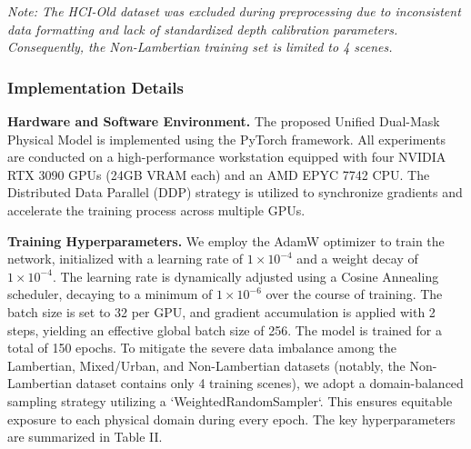 \begin{table}[!t]
\small
\caption{Dataset Domain / Scene Type No. of Scenes (Train / Test).}
\label{tab:table1}
\centering
{}
\end{table}
\textit{Note: The HCI-Old dataset was excluded during preprocessing due to inconsistent data formatting and lack of standardized depth calibration parameters. Consequently, the Non-Lambertian training set is limited to 4 scenes.}

\subsubsection{Implementation Details}

\textbf{Hardware and Software Environment.} 
The proposed Unified Dual-Mask Physical Model is implemented using the PyTorch framework. All experiments are conducted on a high-performance workstation equipped with four NVIDIA RTX 3090 GPUs (24GB VRAM each) and an AMD EPYC 7742 CPU. The Distributed Data Parallel (DDP) strategy is utilized to synchronize gradients and accelerate the training process across multiple GPUs.

\textbf{Training Hyperparameters.} 
We employ the AdamW optimizer to train the network, initialized with a learning rate of $1 \times 10^{-4}$ and a weight decay of $1 \times 10^{-4}$. The learning rate is dynamically adjusted using a Cosine Annealing scheduler, decaying to a minimum of $1 \times 10^{-6}$ over the course of training. The batch size is set to 32 per GPU, and gradient accumulation is applied with 2 steps, yielding an effective global batch size of 256. The model is trained for a total of 150 epochs. To mitigate the severe data imbalance among the Lambertian, Mixed/Urban, and Non-Lambertian datasets (notably, the Non-Lambertian dataset contains only 4 training scenes), we adopt a domain-balanced sampling strategy utilizing a `WeightedRandomSampler`. This ensures equitable exposure to each physical domain during every epoch. The key hyperparameters are summarized in Table II.

